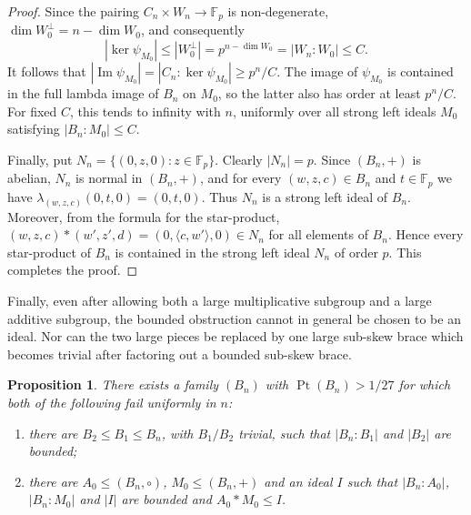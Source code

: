\documentclass[10pt,a4paper]{amsart}
\numberwithin{equation}{section}
\newtheorem{pro}[equation]{Proposition}
\newcommand{\Pt}{\operatorname{Pt} }
\begin{document}
\begin{proof}
Since the pairing $C_n\times W_n\to\mathbb F_p$ is non-degenerate,
$\dim W_0^\perp=n-\dim W_0$, and consequently
$$
|\ker\psi_{M_0}|
\leqslant |W_0^\perp|
=p^{n-\dim W_0}
=|W_n:W_0|
\leqslant C.
$$
It follows that
$|\operatorname{Im}\psi_{M_0}|
=|C_n:\ker\psi_{M_0}|
\geqslant p^n/C$.
The image of $\psi_{M_0}$ is contained in the full lambda image of $B_n$ on $M_0$, so the latter also has order at least $p^n/C$. For fixed $C$, this tends to infinity with $n$, uniformly over all strong left ideals $M_0$ satisfying $|B_n:M_0|\leqslant C$.

Finally, put
$N_n=\{(0,z,0):z\in\mathbb F_p\}$. Clearly $|N_n|=p$. Since $(B_n,+)$ is abelian, $N_n$ is normal in $(B_n,+)$, and for every $(w,z,c)\in B_n$ and $t\in\mathbb F_p$ we have
$\lambda_{(w,z,c)}(0,t,0)=(0,t,0)$. Thus $N_n$ is a strong left ideal of $B_n$. Moreover, from the formula for the star-product,
$(w,z,c)*(w',z',d)=(0,\langle c,w'\rangle,0)\in N_n$
for all elements of $B_n$. Hence every star-product of $B_n$ is contained in the strong left ideal $N_n$ of order $p$. This completes the proof.
\end{proof}

Finally, even after allowing both a large multiplicative subgroup and a
large additive subgroup, the bounded obstruction cannot in general be
chosen to be an ideal. Nor can the two large pieces be replaced by one
large sub-skew brace which becomes trivial after factoring out a bounded
sub-skew brace.

\begin{pro} %
There exists a family $(B_n)$ with $\Pt(B_n)>1/27$ for which both of the
following fail uniformly in $n$:
\begin{enumerate}
\item there are $B_2\leqslant B_1\leqslant B_n$, with $B_1/B_2$
trivial, such that $|B_n:B_1|$ and $|B_2|$ are bounded;
\item there are $A_0\leqslant(B_n,\circ)$, $M_0\leqslant(B_n,+)$ and
an ideal $I$ such that $|B_n:A_0|$, $|B_n:M_0|$ and $|I|$ are bounded
and $A_0*M_0\leqslant I$.
\end{enumerate}
\end{pro}
\end{document}
